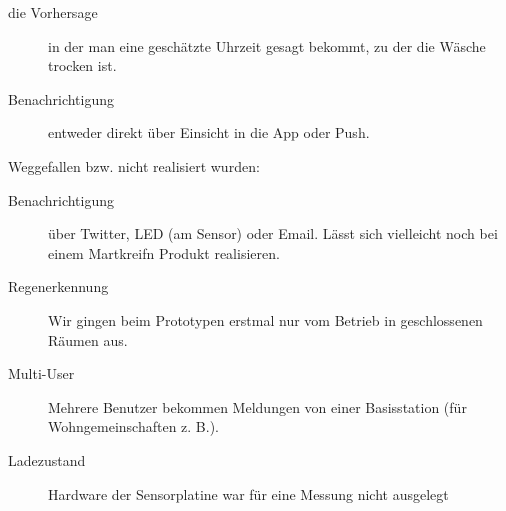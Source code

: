 \begin{description}
\begin{description}
			\item [die Vorhersage] in der man eine geschätzte Uhrzeit gesagt bekommt, zu der die Wäsche trocken ist.
			\item [Benachrichtigung] entweder direkt über Einsicht in die App oder Push.
		\end{description}
		Weggefallen bzw. nicht realisiert wurden:
		\begin{description}
			\item [Benachrichtigung] über Twitter, LED (am Sensor) oder Email. Lässt sich vielleicht noch bei einem Martkreifn Produkt realisieren.
			\item [Regenerkennung] Wir gingen beim Prototypen erstmal nur vom Betrieb in geschlossenen Räumen aus.
			\item [Multi-User] Mehrere Benutzer bekommen Meldungen von einer Basisstation (für Wohngemeinschaften z. B.).
			\item [Ladezustand] Hardware der Sensorplatine war für eine Messung nicht ausgelegt
		\end{description}
\end{description}